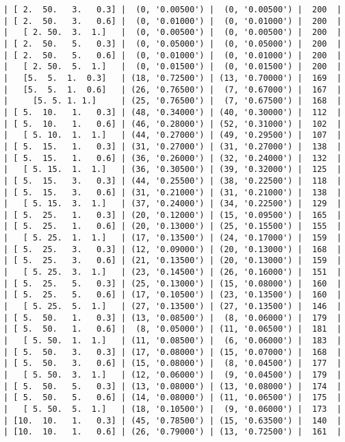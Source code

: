 \documentclass{article}
\begin{document}
\begin{verbatim}
| [ 2.  50.   3.   0.3] |  (0, '0.00500') |  (0, '0.00500') |  200  |
| [ 2.  50.   3.   0.6] |  (0, '0.01000') |  (0, '0.01000') |  200  |
|   [ 2. 50.  3.  1.]   |  (0, '0.00500') |  (0, '0.00500') |  200  |
| [ 2.  50.   5.   0.3] |  (0, '0.05000') |  (0, '0.05000') |  200  |
| [ 2.  50.   5.   0.6] |  (0, '0.01000') |  (0, '0.01000') |  200  |
|   [ 2. 50.  5.  1.]   |  (0, '0.01500') |  (0, '0.01500') |  200  |
|   [5.  5.  1.  0.3]   | (18, '0.72500') | (13, '0.70000') |  169  |
|   [5.  5.  1.  0.6]   | (26, '0.76500') |  (7, '0.67000') |  167  |
|     [5. 5. 1. 1.]     | (25, '0.76500') |  (7, '0.67500') |  168  |
| [ 5.  10.   1.   0.3] | (48, '0.34000') | (40, '0.30000') |  112  |
| [ 5.  10.   1.   0.6] | (46, '0.28000') | (52, '0.31000') |  102  |
|   [ 5. 10.  1.  1.]   | (44, '0.27000') | (49, '0.29500') |  107  |
| [ 5.  15.   1.   0.3] | (31, '0.27000') | (31, '0.27000') |  138  |
| [ 5.  15.   1.   0.6] | (36, '0.26000') | (32, '0.24000') |  132  |
|   [ 5. 15.  1.  1.]   | (36, '0.30500') | (39, '0.32000') |  125  |
| [ 5.  15.   3.   0.3] | (44, '0.25500') | (38, '0.22500') |  118  |
| [ 5.  15.   3.   0.6] | (31, '0.21000') | (31, '0.21000') |  138  |
|   [ 5. 15.  3.  1.]   | (37, '0.24000') | (34, '0.22500') |  129  |
| [ 5.  25.   1.   0.3] | (20, '0.12000') | (15, '0.09500') |  165  |
| [ 5.  25.   1.   0.6] | (20, '0.13000') | (25, '0.15500') |  155  |
|   [ 5. 25.  1.  1.]   | (17, '0.13500') | (24, '0.17000') |  159  |
| [ 5.  25.   3.   0.3] | (12, '0.09000') | (20, '0.13000') |  168  |
| [ 5.  25.   3.   0.6] | (21, '0.13500') | (20, '0.13000') |  159  |
|   [ 5. 25.  3.  1.]   | (23, '0.14500') | (26, '0.16000') |  151  |
| [ 5.  25.   5.   0.3] | (25, '0.13000') | (15, '0.08000') |  160  |
| [ 5.  25.   5.   0.6] | (17, '0.10500') | (23, '0.13500') |  160  |
|   [ 5. 25.  5.  1.]   | (27, '0.13500') | (27, '0.13500') |  146  |
| [ 5.  50.   1.   0.3] | (13, '0.08500') |  (8, '0.06000') |  179  |
| [ 5.  50.   1.   0.6] |  (8, '0.05000') | (11, '0.06500') |  181  |
|   [ 5. 50.  1.  1.]   | (11, '0.08500') |  (6, '0.06000') |  183  |
| [ 5.  50.   3.   0.3] | (17, '0.08000') | (15, '0.07000') |  168  |
| [ 5.  50.   3.   0.6] | (15, '0.08000') |  (8, '0.04500') |  177  |
|   [ 5. 50.  3.  1.]   | (12, '0.06000') |  (9, '0.04500') |  179  |
| [ 5.  50.   5.   0.3] | (13, '0.08000') | (13, '0.08000') |  174  |
| [ 5.  50.   5.   0.6] | (14, '0.08000') | (11, '0.06500') |  175  |
|   [ 5. 50.  5.  1.]   | (18, '0.10500') |  (9, '0.06000') |  173  |
| [10.  10.   1.   0.3] | (45, '0.78500') | (15, '0.63500') |  140  |
| [10.  10.   1.   0.6] | (26, '0.79000') | (13, '0.72500') |  161  |

\end{verbatim}
\end{document}
